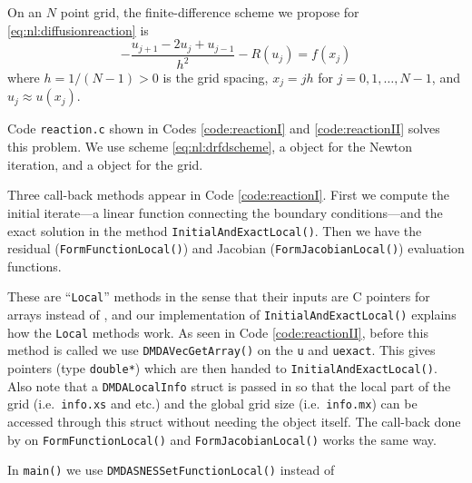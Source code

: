 On an $N$ point grid, the finite-difference scheme we propose for \eqref{eq:nl:diffusionreaction} is
\begin{equation}
- \frac{u_{j+1} - 2 u_j + u_{j-1}}{h^2} - R(u_j) = f(x_j)   \label{eq:nl:drfdscheme}
\end{equation}
where $h=1/(N-1)>0$ is the grid spacing, $x_j = j h$ for $j=0,1,\dots,N-1$, and $u_j \approx u(x_j)$.

Code \texttt{reaction.c} shown in Codes \ref{code:reactionI} and \ref{code:reactionII} solves this problem.  We use scheme \eqref{eq:nl:drfdscheme}, a \pSNES object for the Newton iteration, and a \pDMDA object for the grid.


Three call-back methods appear in Code \ref{code:reactionI}.  First we compute the initial iterate---a linear function connecting the boundary conditions---and the exact solution in the method \texttt{InitialAndExactLocal()}.  Then we have the residual (\texttt{FormFunctionLocal()}) and Jacobian (\texttt{FormJacobianLocal()}) evaluation functions.


These are ``\texttt{Local}'' methods in the sense that their inputs are C pointers for arrays instead of \pVecs, and our implementation of \texttt{InitialAndExactLocal()} explains how the \texttt{Local} methods work.  As seen in Code \ref{code:reactionII}, before this method is called we use \texttt{DMDAVecGetArray()} on the \pVecs \texttt{u} and \texttt{uexact}.  This gives pointers (type \texttt{double*}) which are then handed to \texttt{InitialAndExactLocal()}.  Also note that a \texttt{DMDALocalInfo} struct is passed in so that the local part of the grid (i.e.~\texttt{info.xs} and etc.) and the global grid size (i.e.~\texttt{info.mx}) can be accessed through this struct without needing the \pDMDA object itself.  The call-back done by \pSNES on \texttt{FormFunctionLocal()} and \texttt{FormJacobianLocal()} works the same way.

In \texttt{main()} we use \texttt{DMDASNESSetFunctionLocal()} instead of

